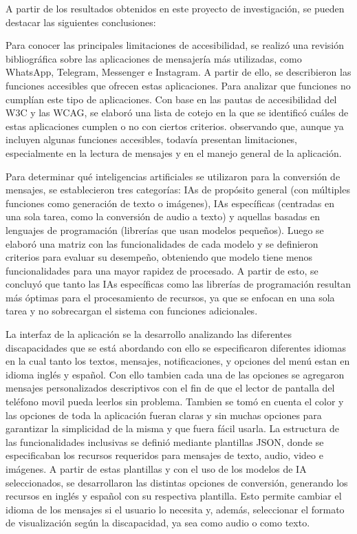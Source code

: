 \documentclass[lettersize,journal]{IEEEtran}
\begin{document}
A partir de los resultados obtenidos en este proyecto de investigación, se pueden destacar las siguientes conclusiones:

\noindent Para conocer las principales limitaciones de accesibilidad, se realizó una revisión bibliográfica sobre las aplicaciones de mensajería más utilizadas, como WhatsApp, Telegram, Messenger e Instagram. A partir de ello, se describieron las funciones accesibles que ofrecen estas aplicaciones. Para analizar que funciones no cumplían este tipo de aplicaciones. Con base en las pautas de accesibilidad del W3C y las WCAG, se elaboró una lista de cotejo en la que se identificó cuáles de estas aplicaciones cumplen o no con ciertos criterios. observando que, aunque ya incluyen algunas funciones accesibles, todavía presentan limitaciones, especialmente en la lectura de mensajes y en el manejo general de la aplicación.

\noindent Para determinar qué inteligencias artificiales se utilizaron para la conversión de mensajes, se establecieron tres categorías: IAs de propósito general (con múltiples funciones como generación de texto o imágenes), IAs específicas (centradas en una sola tarea, como la conversión de audio a texto) y aquellas basadas en lenguajes de programación (librerías que usan modelos pequeños). Luego se elaboró una matriz con las funcionalidades de cada modelo y se definieron criterios para evaluar su desempeño, obteniendo que modelo tiene menos funcionalidades para una mayor rapidez de procesado. A partir de esto, se concluyó que tanto las IAs específicas como las librerías de programación resultan más óptimas para el procesamiento de recursos, ya que se enfocan en una sola tarea y no sobrecargan el sistema con funciones adicionales.

\noindent La interfaz de la aplicación se la desarrollo analizando las diferentes discapacidades que se está abordando con ello se especificaron diferentes idiomas en la cual tanto los textos, mensajes, notificaciones, y opciones del menú estan en idioma inglés y español. Con ello tambien cada una de las opciones se agregaron mensajes personalizados descriptivos con el fin de que el lector de pantalla del teléfono movil pueda leerlos sin problema. Tambien se tomó en cuenta el color y las opciones de toda la aplicación fueran claras y sin muchas opciones para garantizar la simplicidad de la misma y que fuera fácil usarla. 
\noindent La estructura de las funcionalidades inclusivas se definió mediante plantillas JSON, donde se especificaban los recursos requeridos para mensajes de texto, audio, video e imágenes. A partir de estas plantillas y con el uso de los modelos de IA seleccionados, se desarrollaron las distintas opciones de conversión, generando los recursos en inglés y español con su respectiva plantilla. Esto permite cambiar el idioma de los mensajes si el usuario lo necesita y, además, seleccionar el formato de visualización según la discapacidad, ya sea como audio o como texto.
\end{document}
